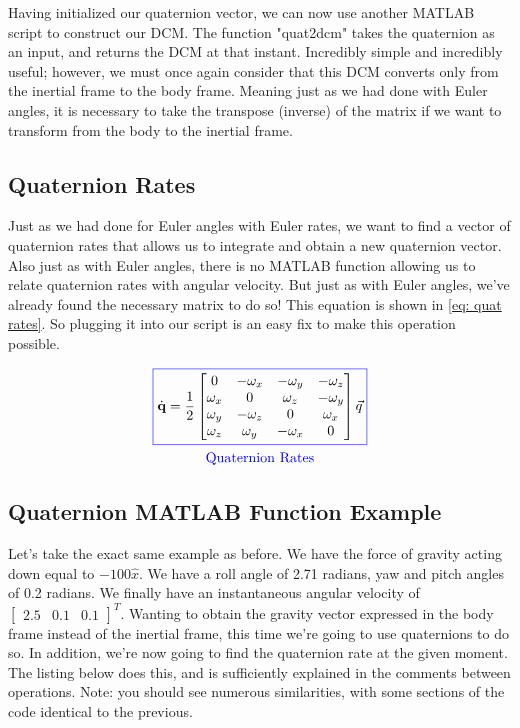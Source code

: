 \documentclass[12pt]{report}
\begin{document}
Having initialized our quaternion vector, we can now use another MATLAB script to construct our DCM. The function "quat2dcm" takes the quaternion as an input, and returns the DCM at that instant. Incredibly simple and incredibly useful; however, we must once again consider that this DCM converts only from the inertial frame to the body frame. Meaning just as we had done with Euler angles, it is necessary to take the transpose (inverse) of the matrix if we want to transform from the body to the inertial frame.


\subsection{Quaternion Rates}\label{sec: quaternion rates}

Just as we had done for Euler angles with Euler rates, we want to find a vector of quaternion rates that allows us to integrate and obtain a new quaternion vector. Also just as with Euler angles, there is no MATLAB function allowing us to relate quaternion rates with angular velocity. But just as with Euler angles, we've already found the necessary matrix to do so! This equation is shown in \eqref{eq: quat rates}. So plugging it into our script is an easy fix to make this operation possible.

\begin{gather}\label{eq: quat rates}
    \color{blue}\boxed{\color{black}\dot{\textbf{q}}=\frac{1}{2}\begin{bmatrix}
        0&-\omega_x&-\omega_y&-\omega_z\\
        \omega_x&0&\omega_z&-\omega_y\\
        \omega_y&-\omega_z&0&\omega_x\\
        \omega_z&\omega_y&-\omega_x&0
    \end{bmatrix}\vec{q}}
    \\\mathrm{\color{blue}Quaternion \ Rates}
\end{gather}

\subsection{Quaternion MATLAB Function Example}

Let's take the exact same example as before. We have the force of gravity acting down equal to $-100\hat{x}$. We have a roll angle of 2.71 radians, yaw and pitch angles of 0.2 radians. We finally have an instantaneous angular velocity of $\begin{bmatrix}
    2.5&0.1&0.1
\end{bmatrix}^T$. Wanting to obtain the gravity vector expressed in the body frame instead of the inertial frame, this time we're going to use quaternions to do so. In addition, we're now going to find the quaternion rate at the given moment. The listing below does this, and is sufficiently explained in the comments between operations. Note: you should see numerous similarities, with some sections of the code identical to the previous. 
\end{document}
